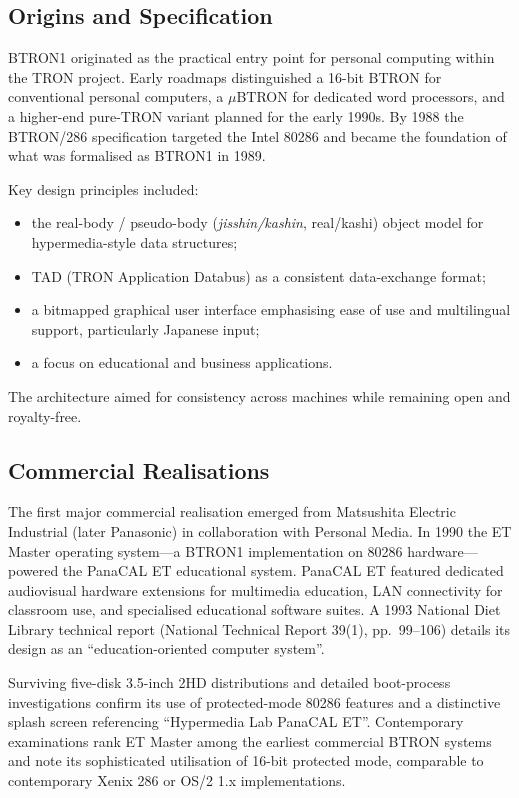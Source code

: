 \documentclass{article}
\begin{document}
\subsection{Origins and Specification}

BTRON1 originated as the practical entry point for personal computing within the TRON project. Early roadmaps distinguished a 16-bit BTRON for conventional personal computers, a \(\mu\)BTRON for dedicated word processors, and a higher-end pure-TRON variant planned for the early 1990s. By 1988 the BTRON/286 specification targeted the Intel 80286 and became the foundation of what was formalised as BTRON1 in 1989.

Key design principles included:

\begin{itemize}
  \item the real-body / pseudo-body (\textit{jisshin/kashin}, real/kashi) object model for hypermedia-style data structures;
  \item TAD (TRON Application Databus) as a consistent data-exchange format;
  \item a bitmapped graphical user interface emphasising ease of use and multilingual support, particularly Japanese input;
  \item a focus on educational and business applications.
\end{itemize}

The architecture aimed for consistency across machines while remaining open and royalty-free.

\subsection{Commercial Realisations}

The first major commercial realisation emerged from Matsushita Electric Industrial (later Panasonic) in collaboration with Personal Media. In 1990 the ET Master operating system---a BTRON1 implementation on 80286 hardware---powered the PanaCAL ET educational system. PanaCAL ET featured dedicated audiovisual hardware extensions for multimedia education, LAN connectivity for classroom use, and specialised educational software suites. A 1993 National Diet Library technical report (National Technical Report 39(1), pp.~99--106) details its design as an ``education-oriented computer system''.

Surviving five-disk 3.5-inch 2HD distributions and detailed boot-process investigations confirm its use of protected-mode 80286 features and a distinctive splash screen referencing ``Hypermedia Lab PanaCAL ET''. Contemporary examinations rank ET Master among the earliest commercial BTRON systems and note its sophisticated utilisation of 16-bit protected mode, comparable to contemporary Xenix 286 or OS/2 1.x implementations.
\end{document}
